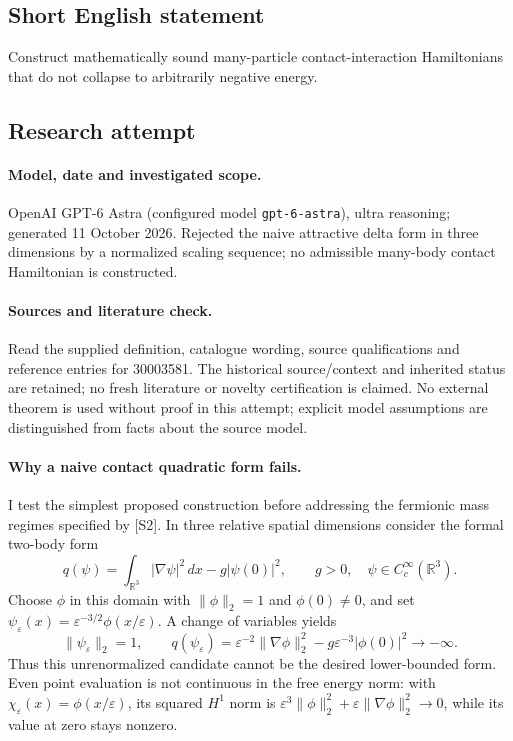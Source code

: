 \documentclass[11pt]{article}
\begin{document}
\subsection{Short English statement}
Construct mathematically sound many-particle contact-interaction Hamiltonians that do not collapse to arbitrarily negative energy.
\subsection{Research attempt}
\paragraph{Model, date and investigated scope.}
OpenAI GPT-6 Astra (configured model \texttt{gpt-6-astra}), ultra reasoning; generated 11 October 2026. Rejected the naive attractive delta form in three dimensions by a normalized scaling sequence; no admissible many-body contact Hamiltonian is constructed.

\paragraph{Sources and literature check.}
Read the supplied definition, catalogue wording, source qualifications and reference entries for 30003581. The historical source/context and inherited status are retained; no fresh literature or novelty certification is claimed. No external theorem is used without proof in this attempt; explicit model assumptions are distinguished from facts about the source model.

\paragraph{Why a naive contact quadratic form fails.} I test the simplest proposed construction before addressing the fermionic mass regimes specified by [S2]. In three relative spatial dimensions consider the formal two-body form
\[
 q(\psi)=\int_{\mathbb R^3}|\nabla\psi|^2\,dx-g|\psi(0)|^2,
 \qquad g>0,\quad\psi\in C_c^\infty(\mathbb R^3).
\]
Choose \(\phi\) in this domain with \(\|\phi\|_2=1\) and \(\phi(0)\ne0\), and set \(\psi_\varepsilon(x)=\varepsilon^{-3/2}\phi(x/\varepsilon)\). A change of variables yields
\[
 \|\psi_\varepsilon\|_2=1,\qquad
 q(\psi_\varepsilon)=\varepsilon^{-2}\|\nabla\phi\|_2^2-g\varepsilon^{-3}|\phi(0)|^2\longrightarrow-\infty.
\]
Thus this unrenormalized candidate cannot be the desired lower-bounded form. Even point evaluation is not continuous in the free energy norm: with \(\chi_\varepsilon(x)=\phi(x/\varepsilon)\), its squared \(H^1\) norm is \(\varepsilon^3\|\phi\|_2^2+\varepsilon\|\nabla\phi\|_2^2\to0\), while its value at zero stays nonzero.
\end{document}
